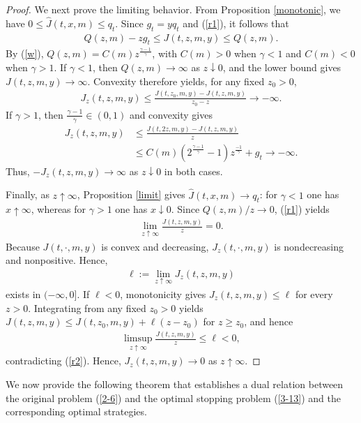 \documentclass[a4paper,11pt]{amsart}
\numberwithin{equation}{section}
\newcommand{\blue}[1]{{\color{black}#1}}
\begin{document}
{\begin{proof}
\color{black}
We next prove the limiting behavior. From Proposition \ref{monotonic},
we have $0\leq\widehat J(t,x,m)\leq q_t$. Since $g_t=yq_t$ and (\ref{r1}), it follows that
\begin{align*}
Q(z,m)-zg_t\leq J(t,z,m,y)\leq Q(z,m).
\end{align*}
By (\ref{w}), $Q(z,m)=C(m)z^\frac{\gamma-1}{\gamma}$, with $C(m)>0$ when $\gamma<1$ and $C(m)<0$ when $\gamma>1$. If $\gamma<1$, then $Q(z,m)\to\infty$ as $z\downarrow0$, and the lower bound gives $J(t,z,m,y)\to\infty$. Convexity therefore yields, for any fixed $z_0>0$,
\begin{align*}
J_z(t,z,m,y)\leq\frac{J(t,z_0,m,y)-J(t,z,m,y)}{z_0-z}\longrightarrow-\infty.
\end{align*}
If $\gamma>1$, then $\frac{\gamma-1}{\gamma} \in(0,1)$ and convexity gives
\begin{align*}
J_z(t,z,m,y)&\leq\frac{J(t,2z,m,y)-J(t,z,m,y)}{z}\\
&\leq C(m)(2^\frac{\gamma-1}{\gamma}-1)z^{\frac{-1}{\gamma}}+g_t\longrightarrow-\infty.
\end{align*}
Thus, $-J_z(t,z,m,y)\to\infty$ as $z\downarrow0$ in both cases.

Finally, as $z\uparrow\infty$, Proposition \ref{limit} gives $\widehat J(t,x,m)\to q_t$: for $\gamma<1$ one has $x\uparrow\infty$, whereas for $\gamma>1$ one has $x\downarrow0$. Since $Q(z,m)/z\to0$, (\ref{r1}) yields
\begin{align}\label{r2}
\lim_{z\uparrow\infty}\frac{J(t,z,m,y)}{z}=0.
\end{align}
Because $J(t,\cdot,m,y)$ is convex and decreasing, $J_z(t,\cdot,m,y)$ is nondecreasing and nonpositive. Hence, 
\begin{align*}
	\ell :=\lim_{z\uparrow \infty}J_z(t,z,m,y)
\end{align*}
\blue{exists in $(-\infty,0]$. If $\ell<0$, monotonicity gives $J_z(t,z,m,y)\leq\ell$ for every $z>0$. Integrating from any fixed $z_0>0$ yields $J(t,z,m,y)\leq J(t,z_0,m,y)+\ell(z-z_0)$ for $z\geq z_0$, and hence}
{\color{black}
\begin{align*}
\limsup_{z\uparrow\infty}\frac{J(t,z,m,y)}{z}\leq\ell<0,
\end{align*}
}
contradicting (\ref{r2}). Hence, $J_z(t,z,m,y)\to0$ as $z\uparrow\infty$.
\end{proof}


We now provide the following theorem that establishes a dual relation between the original problem (\ref{2-6}) and the optimal stopping problem (\ref{3-13}) and the corresponding optimal strategies.  



}
\end{document}
